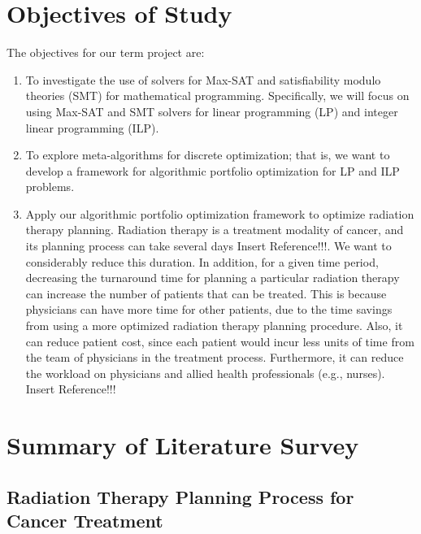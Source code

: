 \documentclass[letter,12pt]{article}
\begin{document}
\section{Objectives of Study}
\label{sec:objectivesofstudy}

The objectives for our term project are: \vspace{-0.3cm}
\begin{enumerate} \itemsep -4pt
\item To investigate the use of solvers for Max-SAT and satisfiability modulo theories (SMT) for mathematical programming. Specifically, we will focus on using Max-SAT and SMT solvers for linear programming (LP) and integer linear programming (ILP).
\item To explore meta-algorithms for discrete optimization; that is, we want to develop a framework for algorithmic portfolio optimization for LP and ILP problems.
\item Apply our algorithmic portfolio optimization framework to optimize radiation therapy planning. Radiation therapy is a treatment modality of cancer, and its planning process can take several days {\Huge Insert Reference!!!}. We want to considerably reduce this duration. In addition, for a given time period, decreasing the turnaround time for planning a particular radiation therapy can increase the number of patients that can be treated. This is because physicians can have more time for other patients, due to the time savings from using a more optimized radiation therapy planning procedure. Also, it can reduce patient cost, since each patient would incur less units of time from the team of physicians in the treatment process. Furthermore, it can reduce the workload on physicians and allied health professionals (e.g., nurses). {\Huge Insert Reference!!!}
\end{enumerate}



\section{Summary of Literature Survey}
\label{sec:summaryofliteraturesurvey}

\subsection{Radiation Therapy Planning Process for Cancer Treatment}
\label{ssec:radiationtherapyplanningprocess}
\end{document}
